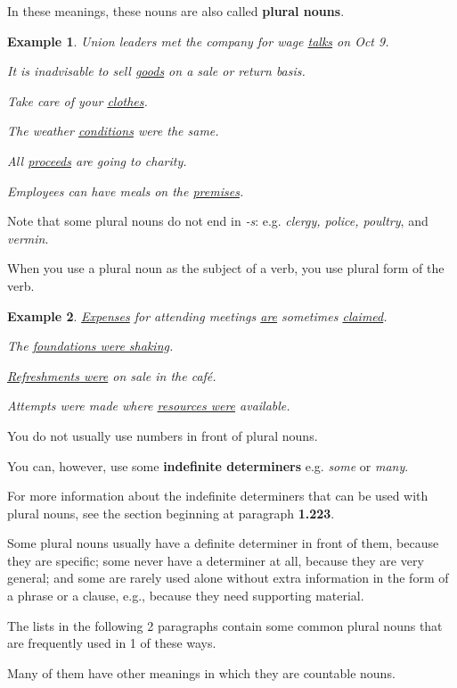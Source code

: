 \documentclass[oneside]{book}
\numberwithin{equation}{section}
\newtheorem{example}{Example}[section]
\begin{document}
In these meanings, these nouns are also called \textbf{plural nouns}.
\begin{example}
    Union leaders met the company for wage \underline{talks} on Oct 9.
    
    It is inadvisable to sell \underline{goods} on a sale or return basis.
    
    Take care of your \underline{clothes}.
    
    The weather \underline{conditions} were the same.
    
    All \underline{proceeds} are going to charity.
    
    Employees can have meals on the \underline{premises}.
\end{example}
Note that some plural nouns do not end in \textit{-s}: e.g. \textit{clergy, police, poultry}, and \textit{vermin}.

%
\noindent{} When you use a plural noun as the subject of a verb, you use plural form of the verb.
\begin{example}
    \underline{Expenses} for attending meetings \underline{are} sometimes \underline{claimed}.
    
    The \underline{foundations were shaking}.
    
    \underline{Refreshments were} on sale in the caf\'e.
    
    Attempts were made where \underline{resources were} available.
\end{example}
%
\noindent{} You do not usually use numbers in front of plural nouns.

You can, however, use some \textbf{indefinite determiners} e.g. \textit{some} or \textit{many}.

For more information about the indefinite determiners that can be used with plural nouns, see the section beginning at paragraph \textbf{1.223}.

%
Some plural nouns usually have a definite determiner in front of them, because they are specific; some never have a determiner at all, because they are very general; and some are rarely used alone without extra information in the form of a phrase or a clause, e.g., because they need supporting material.

%
The lists in the following 2 paragraphs contain some common plural nouns that are frequently used in 1 of these ways.

Many of them have other meanings in which they are countable nouns.
\end{document}
